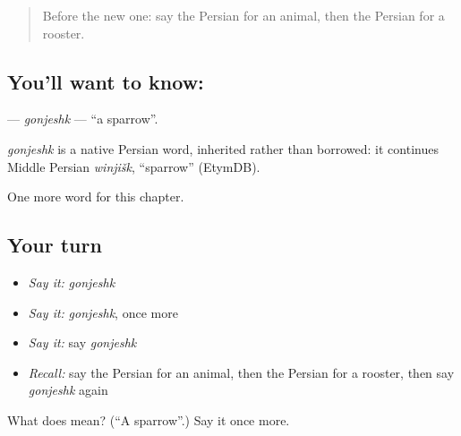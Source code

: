 \label{lesson:FA-C171-gonjeshk}



\begin{quote}
Before the new one: say the Persian for an animal, then the Persian for a rooster.
\end{quote}

\subsection*{You'll want to know: }
\textbf{} — \emph{gonjeshk} — \textquotedblleft{}a sparrow\textquotedblright{}.

\begin{cousinweb}
\emph{gonjeshk} is a native Persian word, inherited rather than borrowed: it continues Middle Persian \emph{winjišk}, \textquotedblleft{}sparrow\textquotedblright{} (EtymDB).
\end{cousinweb}

\begin{grammarlens}[title={What you've built}]
One more word for this chapter.
\end{grammarlens}

\subsection*{Your turn}
\begin{itemize}
\raggedright
  \item \emph{Say it:} \emph{gonjeshk}
  \item \emph{Say it:} \emph{gonjeshk}, once more
  \item \emph{Say it:} say \emph{gonjeshk}
  \item \emph{Recall:} say the Persian for an animal, then the Persian for a rooster, then say \emph{gonjeshk} again
\end{itemize}

\begin{tcolorbox}[breakable,colback=teal!4,colframe=teal!35!black,title={Before you move on}]
What does  mean? (\textquotedblleft{}A sparrow\textquotedblright{}.) Say it once more.
\end{tcolorbox}
